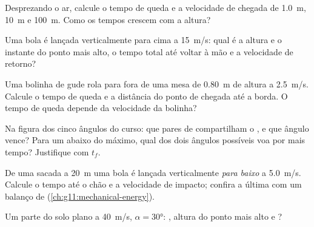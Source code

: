 \begin{exercise}[$\star$]\label{exo:g12:projectile-motion:3}
Desprezando o ar, calcule o tempo de queda e a velocidade de chegada de \qty{1.0}{m},
\qty{10}{m} e \qty{100}{m}. Como os tempos crescem com a altura?
\end{exercise}

\begin{exercise}[$\star$]\label{exo:g12:projectile-motion:4}
Uma bola é lançada verticalmente para cima a \qty{15}{m/s}: qual é a altura e o
instante do ponto mais alto, o tempo total até voltar à mão e a velocidade de retorno?
\end{exercise}

\begin{exercise}[$\star$]\label{exo:g12:projectile-motion:5}
Uma bolinha de gude rola para fora de uma mesa de \qty{0.80}{m} de altura a
\qty{2.5}{m/s}. Calcule o tempo de queda e a distância do ponto de chegada até a
borda. O tempo de queda depende da velocidade da bolinha?
\end{exercise}

\begin{exercise}[$\star\star$]\label{exo:g12:projectile-motion:6}
Na figura dos cinco ângulos do curso: que pares de 
compartilham o , e que ângulo vence? Para um  abaixo do máximo, qual dos
dois ângulos possíveis voa por mais tempo? Justifique com $t_f$.
\end{exercise}

\begin{exercise}[$\star\star$]\label{exo:g12:projectile-motion:7}
De uma sacada a \qty{20}{m} uma bola é lançada verticalmente \emph{para baixo} a
\qty{5.0}{m/s}. Calcule o tempo até o chão e a velocidade de impacto; confira a última
com um balanço de  (\cref{ch:g11:mechanical-energy}).
\end{exercise}

\begin{exercise}[$\star\star$]\label{exo:g12:projectile-motion:8}
Um  parte do solo plano a \qty{40}{m/s}, $\alpha = \ang{30}$: ,
altura do ponto mais alto e ?
\end{exercise}

